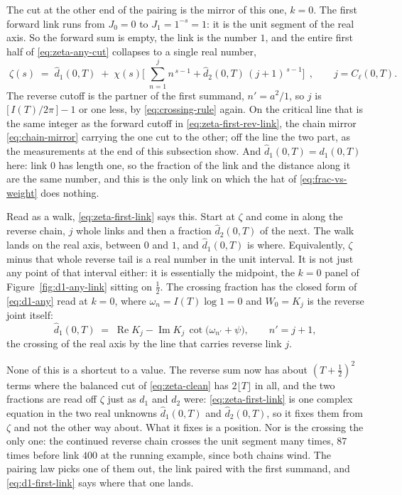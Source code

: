 \documentclass[11pt]{article}
\theoremstyle{definition}
\begin{document}
The cut at the other end of the pairing is the mirror of this one, $k=0$.
The first forward link runs from $J_0=0$ to
$J_1=1^{-s}=1$: it is the unit segment of the real axis. So the forward sum is
empty, the link is the number $1$, and the entire first half of
\eqref{eq:zeta-any-cut} collapses to a single real number,
\begin{equation}\label{eq:zeta-first-link}
\boxed{\;
\zeta(s)
\;=\;
\hat d_1(0,T)
\;+\;\chi(s)\Biggl[\;\sum_{n=1}^{j}n^{\,s-1}+\hat d_2(0,T)\,(j+1)^{\,s-1}\Biggr]
\;}\,,
\qquad j=C_{\ell}(0,T).
\end{equation}
The reverse cutoff is the partner of the first summand, $n'=a^{2}/1$, so $j$
is $\bigl[\,I(T)/2\pi\,\bigr]-1$ or one less, by \eqref{eq:crossing-rule}
again. On the critical line that is the same integer as the forward cutoff in
\eqref{eq:zeta-first-rev-link}, the chain mirror \eqref{eq:chain-mirror}
carrying the one cut to the other; off the line the two part, as the
measurements at the end of this subsection show. And
$\hat d_1(0,T)=d_1(0,T)$ here: link $0$ has length one, so the fraction of the
link and the distance along it are the same number, and this is the only link
on which the hat of \eqref{eq:frac-vs-weight} does nothing.

Read as a walk, \eqref{eq:zeta-first-link} says this. Start at $\zeta$ and come
in along the reverse chain, $j$ whole links and then a fraction
$\hat d_2(0,T)$ of the next. The walk lands on the real axis, between $0$ and
$1$, and $\hat d_1(0,T)$ is where. Equivalently, $\zeta$ minus that whole
reverse tail is a real number in the unit interval. It is not just any point of
that interval either: it is essentially the midpoint, the $k=0$ panel of
Figure~\ref{fig:d1-any-link} sitting on $\tfrac12$. The crossing fraction has
the closed form of \eqref{eq:d1-any} read at $k=0$, where
$\omega_n=I(T)\log1=0$ and $W_0=K_j$ is the reverse joint itself:
\begin{equation}\label{eq:d1-first-link}
\hat d_1(0,T)
\;=\;
\operatorname{Re}K_j-\operatorname{Im}K_j\,\cot\bigl(\omega_{n'}+\psi\bigr),
\qquad n'=j+1,
\end{equation}
the crossing of the real axis by the line that carries reverse link $j$.

None of this is a shortcut to a value. The reverse sum now has about
$(T+\tfrac12)^{2}$ terms where the balanced cut of \eqref{eq:zeta-clean} has
$2\lfloor T\rfloor$ in all, and the two fractions are read off $\zeta$ just as
$d_1$ and $d_2$ were: \eqref{eq:zeta-first-link} is one complex equation in the
two real unknowns $\hat d_1(0,T)$ and $\hat d_2(0,T)$, so it fixes them from
$\zeta$ and not the other way about. What it fixes is a position. Nor is the
crossing the only one: the continued reverse chain crosses the unit segment many
times, $87$ times before link $400$ at the running example, since both chains
wind. The pairing law picks one of them out, the link paired with the first
summand, and \eqref{eq:d1-first-link} says where that one lands.
\end{document}
